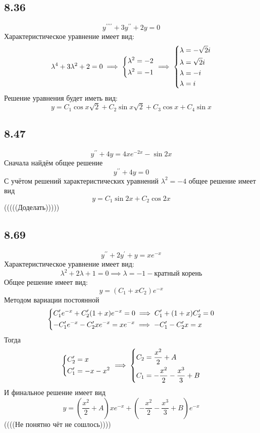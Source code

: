 \documentclass[12pt]{article}
\begin{document}
\subsection*{8.36}
\[
    y^{\prime\prime\prime\prime} + 3y^{\prime\prime} + 2y = 0
\]
Характеристическое уравнение имеет вид: 
\[
    \lambda^4 + 3\lambda^2 + 2 = 0 \implies 
    \begin{dcases}
        \lambda^2 = -2 \\
        \lambda^2 = -1
    \end{dcases} \implies 
    \begin{dcases}
        \lambda = -\sqrt{2} i \\
        \lambda = \sqrt{2} i \\
        \lambda = -i \\
        \lambda = i
    \end{dcases}
\]
Решение уравнения будет иметь вид: 
\[
    y = C_1 \cos x\sqrt{2}  + C_2 \sin x\sqrt{2}  + C_3 \cos x + C_4 \sin x
\]
\subsection*{8.47}
\[
    y^{\prime\prime} + 4y = 4xe^{-2x} - \sin 2x
\]
Сначала найдём общее решение 
\[
    y^{\prime\prime} + 4y = 0
\]
С учётом решений характеристических уравнений $\lambda^2 = -4$ общее решение имеет вид 
\[
    y = C_1 \sin 2x + C_2 \cos 2x
\]
(((((Доделать)))))

\subsection*{8.69}
\[
    y^{\prime\prime} + 2y^{\prime} + y = xe^{-x}
\]
Характеристическое уравнение имеет вид: 
\[
    \lambda^2 + 2\lambda + 1 = 0 \implies \lambda = -1 - \text{кратный корень} 
\]
Общее решение имеет вид: 
\[
    y = (C_1 + x C_2) e^{-x}
\]
Методом вариации постоянной 
\[
    \begin{dcases}
        C_1^{\prime} e^{-x} + C_2^{\prime} (1 + x) e^{-x} = 0 \implies C_1^{\prime} + (1 + x) C_2^{\prime} = 0  \\
        -C_1^{\prime} e^{-x} - C_2^{\prime} x e^{-x} = x e^{-x} \implies -C_1^{\prime} - C_2^{\prime} x = x
    \end{dcases}
\]
Тогда 
\[
    \begin{dcases}
        C_2^{\prime} = x \\
        C_1^{\prime} = -x - x^2
    \end{dcases} \implies 
    \begin{dcases}
        C_2 = \frac{x^2}{2} + A \\
        C_1 = -\frac{x^2}{2} - \frac{x^3}{3} + B
    \end{dcases}
\]
И финальное решение имеет вид
\[
    y = \left( \frac{x^2}{2} + A \right) x e^{-x} + \left( -\frac{x^2}{2} - \frac{x^3}{3} + B \right) e^{-x}  
\]
((((Не понятно чёт не сошлось))))
\end{document}
